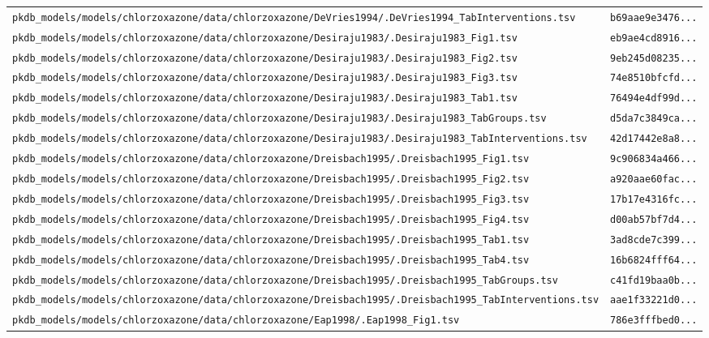 \begin{longtable}{ll}
\texttt{pkdb\_models/models/chlorzoxazone/data/chlorzoxazone/DeVries1994/.DeVries1994\_TabInterventions.tsv} & \texttt{b69aae9e3476...} \\
\texttt{pkdb\_models/models/chlorzoxazone/data/chlorzoxazone/Desiraju1983/.Desiraju1983\_Fig1.tsv} & \texttt{eb9ae4cd8916...} \\
\texttt{pkdb\_models/models/chlorzoxazone/data/chlorzoxazone/Desiraju1983/.Desiraju1983\_Fig2.tsv} & \texttt{9eb245d08235...} \\
\texttt{pkdb\_models/models/chlorzoxazone/data/chlorzoxazone/Desiraju1983/.Desiraju1983\_Fig3.tsv} & \texttt{74e8510bfcfd...} \\
\texttt{pkdb\_models/models/chlorzoxazone/data/chlorzoxazone/Desiraju1983/.Desiraju1983\_Tab1.tsv} & \texttt{76494e4df99d...} \\
\texttt{pkdb\_models/models/chlorzoxazone/data/chlorzoxazone/Desiraju1983/.Desiraju1983\_TabGroups.tsv} & \texttt{d5da7c3849ca...} \\
\texttt{pkdb\_models/models/chlorzoxazone/data/chlorzoxazone/Desiraju1983/.Desiraju1983\_TabInterventions.tsv} & \texttt{42d17442e8a8...} \\
\texttt{pkdb\_models/models/chlorzoxazone/data/chlorzoxazone/Dreisbach1995/.Dreisbach1995\_Fig1.tsv} & \texttt{9c906834a466...} \\
\texttt{pkdb\_models/models/chlorzoxazone/data/chlorzoxazone/Dreisbach1995/.Dreisbach1995\_Fig2.tsv} & \texttt{a920aae60fac...} \\
\texttt{pkdb\_models/models/chlorzoxazone/data/chlorzoxazone/Dreisbach1995/.Dreisbach1995\_Fig3.tsv} & \texttt{17b17e4316fc...} \\
\texttt{pkdb\_models/models/chlorzoxazone/data/chlorzoxazone/Dreisbach1995/.Dreisbach1995\_Fig4.tsv} & \texttt{d00ab57bf7d4...} \\
\texttt{pkdb\_models/models/chlorzoxazone/data/chlorzoxazone/Dreisbach1995/.Dreisbach1995\_Tab1.tsv} & \texttt{3ad8cde7c399...} \\
\texttt{pkdb\_models/models/chlorzoxazone/data/chlorzoxazone/Dreisbach1995/.Dreisbach1995\_Tab4.tsv} & \texttt{16b6824fff64...} \\
\texttt{pkdb\_models/models/chlorzoxazone/data/chlorzoxazone/Dreisbach1995/.Dreisbach1995\_TabGroups.tsv} & \texttt{c41fd19baa0b...} \\
\texttt{pkdb\_models/models/chlorzoxazone/data/chlorzoxazone/Dreisbach1995/.Dreisbach1995\_TabInterventions.tsv} & \texttt{aae1f33221d0...} \\
\texttt{pkdb\_models/models/chlorzoxazone/data/chlorzoxazone/Eap1998/.Eap1998\_Fig1.tsv} & \texttt{786e3fffbed0...} \\

\end{longtable}
